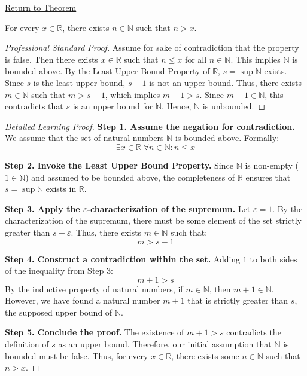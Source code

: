 \newpage
{}
\label{prf:archimedean-property}

\begin{remark*}[Return]
\hyperref[thm:archimedean-property]{Return to Theorem}
\end{remark*}

\begin{theorem*}
For every $x \in \mathbb{R}$, there exists $n \in \mathbb{N}$ such that $n > x$.
\end{theorem*}

\begin{proof}[Professional Standard Proof]
\LRAProofBodyStart
Assume for sake of contradiction that the property is false. Then there exists $x \in \mathbb{R}$ such that $n \le x$ for all $n \in \mathbb{N}$. This implies $\mathbb{N}$ is bounded above. By the Least Upper Bound Property of $\mathbb{R}$, $s = \sup \mathbb{N}$ exists. Since $s$ is the least upper bound, $s-1$ is not an upper bound. Thus, there exists $m \in \mathbb{N}$ such that $m > s-1$, which implies $m+1 > s$. Since $m+1 \in \mathbb{N}$, this contradicts that $s$ is an upper bound for $\mathbb{N}$. Hence, $\mathbb{N}$ is unbounded.
\end{proof}

\begin{proof}[Detailed Learning Proof]
\LRAProofBodyStart

\textbf{Step 1. Assume the negation for contradiction.}
We assume that the set of natural numbers $\mathbb{N}$ is bounded above. Formally:
\[ \exists x \in \mathbb{R} \; \forall n \in \mathbb{N} : n \le x \]

\textbf{Step 2. Invoke the Least Upper Bound Property.}
Since $\mathbb{N}$ is non-empty ($1 \in \mathbb{N}$) and assumed to be bounded above, the completeness of $\mathbb{R}$ ensures that $s = \sup \mathbb{N}$ exists in $\mathbb{R}$.

\textbf{Step 3. Apply the $\varepsilon$-characterization of the supremum.}
Let $\varepsilon = 1$. By the characterization of the supremum, there must be some element of the set strictly greater than $s - \varepsilon$. Thus, there exists $m \in \mathbb{N}$ such that:
\[ m > s - 1 \]

\textbf{Step 4. Construct a contradiction within the set.}
Adding $1$ to both sides of the inequality from Step 3:
\[ m + 1 > s \]
By the inductive property of natural numbers, if $m \in \mathbb{N}$, then $m + 1 \in \mathbb{N}$. However, we have found a natural number $m+1$ that is strictly greater than $s$, the supposed upper bound of $\mathbb{N}$.

\textbf{Step 5. Conclude the proof.}
The existence of $m+1 > s$ contradicts the definition of $s$ as an upper bound. Therefore, our initial assumption that $\mathbb{N}$ is bounded must be false. Thus, for every $x \in \mathbb{R}$, there exists some $n \in \mathbb{N}$ such that $n > x$.
\end{proof}

